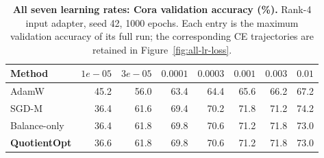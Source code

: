 \begin{table}[t]
\centering\small
\renewcommand{\arraystretch}{1.18}\setlength{\tabcolsep}{5pt}
\caption{\textbf{All seven learning rates: Cora validation accuracy (\%).} Rank-4 input adapter, seed 42, 1000 epochs. Each entry is the maximum validation accuracy of its full run; the corresponding CE trajectories are retained in Figure~\ref{fig:all-lr-loss}.}
\label{tab:cora-lr-accuracy}
\begin{tabular}{@{}lrrrrrrr@{}}
\toprule
Method & $1e-05$ & $3e-05$ & $0.0001$ & $0.0003$ & $0.001$ & $0.003$ & $0.01$\\
\midrule
AdamW & 45.2 & 56.0 & 63.4 & 64.4 & 65.6 & 66.2 & 67.2\\
SGD-M & 36.4 & 61.6 & 69.4 & 70.2 & 71.8 & 71.2 & 74.2\\
Balance-only & 36.4 & 61.8 & 69.8 & 70.6 & 71.2 & 71.8 & 73.0\\
\rowcolor{oursbg}\textbf{QuotientOpt} & 36.6 & 61.8 & 69.8 & 70.6 & 71.2 & 71.8 & 73.0\\
\bottomrule
\end{tabular}
\end{table}
